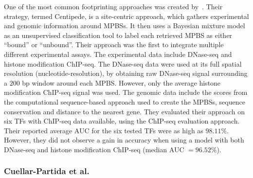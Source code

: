 One of the most common footprinting approaches was created by~\cite{pique2011}. Their strategy, termed Centipede, is a site-centric approach, which gathers experimental and genomic information around MPBSs. It then uses a Bayesian mixture model as an unsupervised classification tool to label each retrieved MPBS as either ``bound'' or ``unbound''. Their approach was the first to integrate multiple different experimental assays. The experimental data include DNase-seq and histone modification ChIP-seq. The DNase-seq data were used at its full spatial resolution (nucleotide-resolution), by obtaining raw DNase-seq signal surrounding a $200$ bp window around each MPBS. However, only the average histone modification ChIP-seq signal was used. The genomic data include the scores from the computational sequence-based approach used to create the MPBSs, sequence conservation and distance to the nearest gene. They evaluated their approach on six TFs with ChIP-seq data available, using the ChIP-seq evaluation approach. Their reported average AUC for the six tested TFs were as high as $98.11\%$. However, they did not observe a gain in accuracy when using a model with both DNase-seq and histone modification ChIP-seq (median AUC $= 96.52\%$).

\subsubsection{Cuellar-Partida et al.}

